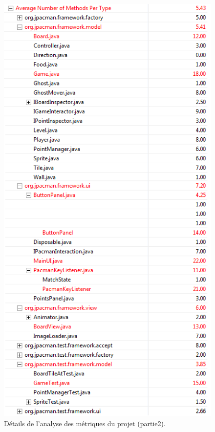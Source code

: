 \documentclass[12pt,a4paper,final]{article}
\begin{document}
\clearpage
\begin{figure}[!h]
	\centering
	\includegraphics[height=\textheight]{Metrique1.png}
	\caption{\label{métrique1}Détails de l'analyse des métriques du projet (partie2).}
\end{figure}
\end{document}
